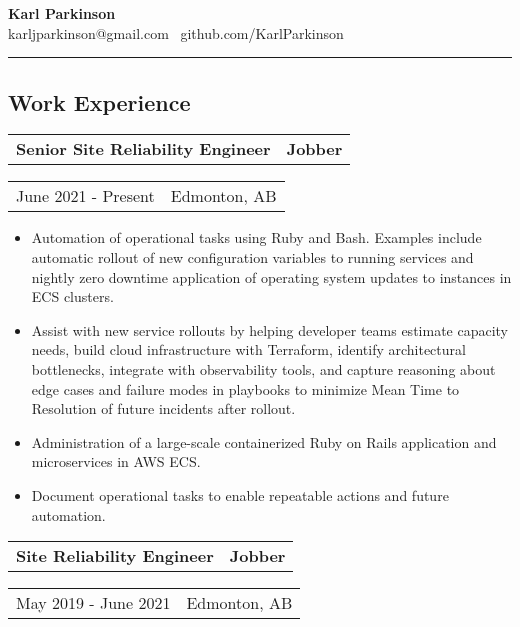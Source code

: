 \documentclass[10pt,letterpaper]{article}
\makeatletter
\newcommand{\headerrow}[2]
{\begin{tabular*}{\linewidth}{l@{\extracolsep{\fill}}r}
	#1 &
	#2 \\
\end{tabular*}}
\makeatother
\begin{document}
\begin{center}
{\LARGE \textbf{Karl Parkinson}}
\\
karljparkinson@gmail.com \textbullet \ github.com/KarlParkinson

\end{center}

\hrule

\subsection*{Work Experience}
       \headerrow
       	        {\textbf{Senior Site Reliability Engineer}}
	        {\textbf{Jobber}}
	\headerrow
		{June 2021 - Present}
		{Edmonton, AB}
		
       \begin{itemize}
          \itemsep0em
                \item Automation of operational tasks using Ruby and Bash. Examples include automatic rollout of new configuration variables to running services and nightly zero downtime application of operating system updates to instances in ECS clusters.
                \item Assist with new service rollouts by helping developer teams estimate capacity needs, build cloud infrastructure with Terraform, identify architectural bottlenecks, integrate with observability tools, and capture reasoning about edge cases and failure modes in playbooks to minimize Mean Time to Resolution of future incidents after rollout.
                \item Administration of a large-scale containerized Ruby on Rails application and microservices in AWS ECS.
                \item Document operational tasks to enable repeatable actions and future automation.
        \end{itemize}
       \headerrow
       	        {\textbf{Site Reliability Engineer}}
	        {\textbf{Jobber}}
	\headerrow
		{May 2019 - June 2021}
		{Edmonton, AB}
		
\end{document}
